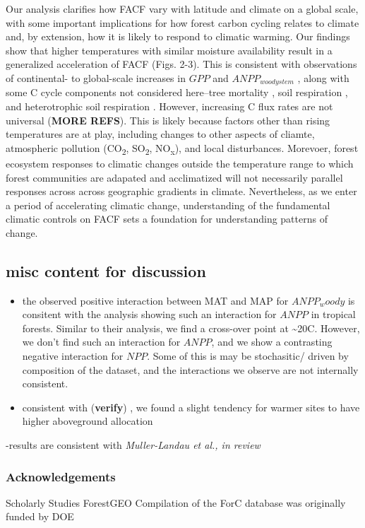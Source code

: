 \documentclass[]{article}
\begin{document}
Our analysis clarifies how FACF vary with latitude and climate on a
global scale, with some important implications for how forest carbon
cycling relates to climate and, by extension, how it is likely to
respond to climatic warming. Our findings show that higher temperatures
with similar moisture availability result in a generalized acceleration
of FACF (Figs. 2-3). This is consistent with observations of
continental- to global-scale increases in \(GPP\)
\citep{li_mapping_2019} and \(ANPP_{woody stem}\)
\citep{brienen_long-term_2015, hubau_asynchronous_2020}, along with some
C cycle components not considered here--tree mortality
\citep{brienen_long-term_2015, mcdowell_drivers_2018}, soil respiration
\citep{bond-lamberty_global_2010}, and heterotrophic soil respiration
\citep{bond-lamberty_globally_2018}. However, increasing C flux rates
are not universal \citep{rutishauser_testing_2020} (\textbf{MORE REFS}).
This is likely because factors other than rising temperatures are at
play, including changes to other aspects of cliamte, atmospheric
pollution (CO\textsubscript{2}, SO\textsubscript{2},
NO\textsubscript{x}), and local disturbances. Morevoer, forest ecosystem
responses to climatic changes outside the temperature range to which
forest communities are adapated and acclimatized will not necessarily
parallel responses across across geographic gradients in climate.
Nevertheless, as we enter a period of accelerating climatic change,
understanding of the fundamental climatic controls on FACF sets a
foundation for understanding patterns of change.

\subsection{misc content for
discussion}\label{misc-content-for-discussion}

\begin{itemize}
\item
  the observed positive interaction between MAT and MAP for
  \(ANPP_woody\) is consitent with the \citet{taylor_temperature_2017}
  analysis showing such an interaction for \(ANPP\) in tropical forests.
  Similar to their analysis, we find a cross-over point at
  \textasciitilde{}20C. However, we don't find such an interaction for
  \(ANPP\), and we show a contrasting negative interaction for \(NPP\).
  Some of this is may be stochasitic/ driven by composition of the
  dataset, and the interactions we observe are not internally
  consistent.
\item
  consistent with \citep{hofhansl_new_2015} (\textbf{verify}) , we found
  a slight tendency for warmer sites to have higher aboveground
  allocation
\end{itemize}

-results are consistent with \emph{Muller-Landau et al., in review}

\subsubsection{Acknowledgements}\label{acknowledgements}

Scholarly Studies ForestGEO Compilation of the ForC database was
originally funded by DOE


\end{document}
